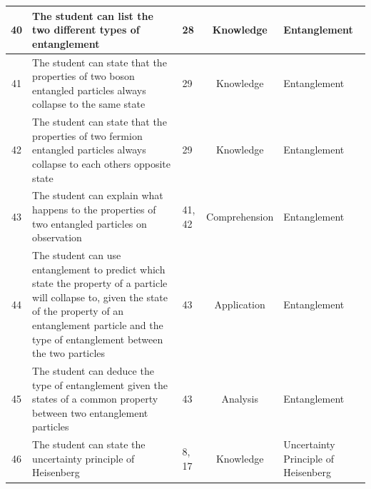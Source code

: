 \documentclass[11pt,twoside]{report} %
\begin{document}
\begin{table}[htbp]
\begin{center}
\begin{tabular}{|c|p{5cm}|p{1.5cm}|c|p{3cm}|}
40 & The student can list the two different types of entanglement & 28 & Knowledge & Entanglement \\ \hline
41 & The student can state that the properties of two boson entangled particles always collapse to the same state & 29 & Knowledge & Entanglement \\ \hline
42 & The student can state that the properties of two fermion entangled particles always collapse to each others opposite state & 29 & Knowledge & Entanglement \\ \hline
43 & The student can explain what happens to the properties of two entangled particles on observation & 41, 42 & Comprehension & Entanglement \\ \hline
44 & The student can use entanglement to predict which state the property of a particle will collapse to, given the state of the property of an entanglement particle and the type of entanglement between the two particles & 43 & Application & Entanglement \\ \hline
45 & The student can deduce the type of entanglement given the states of a common property between two entanglement particles & 43 & Analysis & Entanglement \\ \hline
46 & The student can state the uncertainty principle of Heisenberg & 8, 17 & Knowledge & Uncertainty Principle of Heisenberg \\ \hline
\end{tabular}
\end{center}
\end{table}
\end{document}
